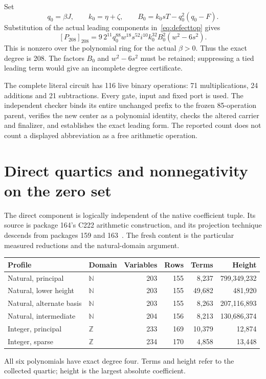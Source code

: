 \documentclass[11pt]{article}
\theoremstyle{remark}\newtheorem{remark}[theorem]{Remark}
\newcommand{\Z}{\mathbb Z}\newcommand{\N}{\mathbb N}
\newcommand{\topdeg}[2]{[#1]_{#2}}
\newcommand{\PrimaryOps}{116}
\newcommand{\PrimaryMul}{71}
\newcommand{\PrimaryAdd}{24}
\newcommand{\PrimarySub}{21}
\begin{document}
Set
\[
 q_0=\beta J,\qquad k_0=\eta+\zeta,\qquad
 B_0=k_0sT-q_0^2(q_0-F).
\]
Substitution of the actual leading components in~\eqref{eq:defecttop}
gives
\begin{equation}\label{eq:maintop}
 \boxed{\displaystyle
 \topdeg{P_{208}}{208}
 =9\,2^{11}q_0^{88}w^{18}s^{52}i^{10}k_0^{32}
 B_0^2(w^2-6s^2).}
\end{equation}
This is nonzero over the polynomial ring for the actual $\beta>0$.
Thus the exact degree is 208. The factors $B_0$ and $w^2-6s^2$ must
be retained; suppressing a tied leading term would give an incomplete
degree certificate.

The complete literal circuit has \PrimaryOps{} live binary operations:
\PrimaryMul{} multiplications, \PrimaryAdd{} additions and
\PrimarySub{} subtractions. Every gate, input and fixed port is used.
The independent checker binds its entire unchanged prefix to the frozen
85-operation parent, verifies the new center as a polynomial identity,
checks the altered carrier and finalizer, and establishes the exact
leading form. The reported count does not count a displayed abbreviation
as a free arithmetic operation.

\section{Direct quartics and nonnegativity on the zero set}\label{sec:quartics}

The direct component is logically independent of the native coefficient
tuple. Its source is package 164's C222 arithmetic construction, and its
projection technique descends from packages 159 and 163~\cite{p159,p163}. The fresh content
is the particular measured reductions and the natural-domain argument.
\begin{center}
\small
\begin{tabular}{llrrrr}
\toprule
Profile & Domain & Variables & Rows & Terms & Height\\
\midrule
Natural, principal & $\N$ & 203 & 155 & 8,237 & 799,349,232\\
Natural, lower height & $\N$ & 203 & 155 & 49,682 & 481,920\\
Natural, alternate basis & $\N$ & 203 & 155 & 8,263 & 207,116,893\\
Natural, intermediate & $\N$ & 204 & 156 & 8,213 & 130,686,374\\
Integer, principal & $\Z$ & 233 & 169 & 10,379 & 12,874\\
Integer, sparse & $\Z$ & 234 & 170 & 4,858 & 13,448\\
\bottomrule
\end{tabular}
\end{center}
All six polynomials have exact degree four. Terms and height refer
to the collected quartic; height is the largest absolute coefficient.
\end{document}
